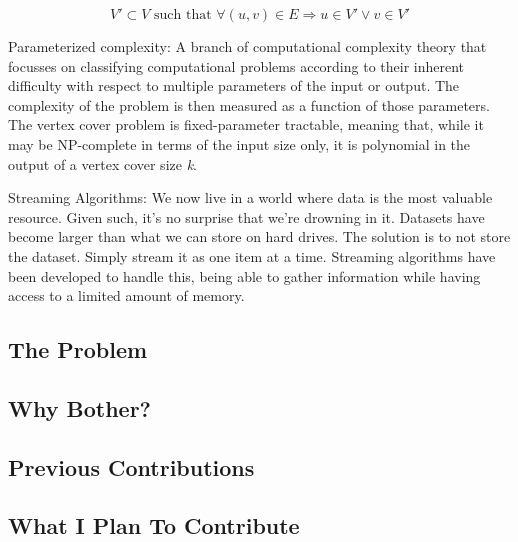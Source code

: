 \[V' \subset V \text{ such that } \forall (u, v) \in E \Rightarrow u \in V' \vee v \in V' \]

Parameterized complexity: A branch of computational complexity theory that focusses on classifying computational problems according to their inherent difficulty with respect to multiple parameters of the input or output. The complexity of the problem is then measured as a function of those parameters. The vertex cover problem is fixed-parameter tractable, meaning that, while it may be NP-complete in terms of the input size only, it is polynomial in the output of a vertex cover size \emph{k}.

Streaming Algorithms: We now live in a world where data is the most valuable resource. Given such, it's no surprise that we're drowning in it. Datasets have become larger than what we can store on hard drives. The solution is to not store the dataset. Simply stream it as one item at a time. Streaming algorithms have been developed to handle this, being able to gather information while having access to a limited amount of memory.

\subsection{The Problem}
\subsection{Why Bother?}
\subsection{Previous Contributions}
\subsection{What I Plan To Contribute}
